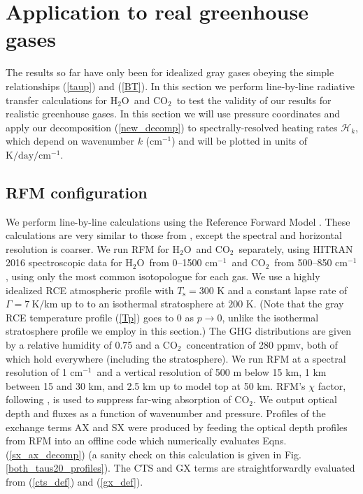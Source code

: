\documentclass{ametsoc}
\newcommand{\eqnref}[1]{(\ref{#1})}
\newcommand{\Kelvin}{\ensuremath{\mathrm{K}}}
\newcommand{\km}{\ensuremath{\mathrm{km}}}
\newcommand{\cminverse}{\ensuremath{\mathrm{cm^{-1}}}}
\newcommand{\Ts}{\ensuremath{T_\mathrm{s}}}
\newcommand{\cotwo}{\ensuremath{\mathrm{CO_2}}}
\newcommand{\htwo}{\ensuremath{\mathrm{H_2O}}}
\newcommand{\ch}{\ensuremath{\mathcal{H}}}
\newcommand{\chk}{\ensuremath{\ch_k}}
\begin{document}
\section{Application to real greenhouse gases} \label{sec_rfm_calcs}
The results so far have only been for idealized gray gases obeying the simple relationships \eqnref{taup} and \eqnref{BT}. In this section we perform line-by-line radiative transfer calculations for \htwo\ and \cotwo\ to test the validity of our results for realistic greenhouse gases. In this section we will use pressure coordinates and apply our decomposition \eqnref{new_decomp} to spectrally-resolved heating rates \chk, which depend on wavenumber $k$ (\cminverse) and will be plotted in  units of $\Kelvin/\mathrm{day}/\cminverse$.

\subsection{RFM configuration}
We perform line-by-line calculations using the Reference Forward Model  \citep[RFM,][]{dudhia2017}. These calculations are very similar to those from \cite{jeevanjee2019a}, except the spectral and horizontal resolution is coarser. We run RFM for \htwo\ and \cotwo\ separately, using  HITRAN 2016 spectroscopic data for \htwo\ from 0--1500 \cminverse\ and \cotwo\ from 500--850 \cminverse, using only the most common isotopologue for each gas. We use a highly idealized RCE atmospheric profile with $\Ts= 300$ K and a constant lapse rate of $\Gamma= 7\ \Kelvin/\km$ up to to an isothermal stratosphere at $200$ K. (Note that the gray RCE temperature profile \eqnref{Tp} goes to 0 as $p\rightarrow 0$, unlike the isothermal stratosphere profile we employ in this section.) The GHG distributions are given by a relative humidity of 0.75 and a  \cotwo\ concentration of 280 ppmv, both of which hold everywhere (including the stratosphere).   We run RFM at a spectral resolution of 1 \cminverse\ and a vertical resolution of 500 m below 15 km, 1 km between 15 and 30 km, and 2.5 km up to model top at 50 km. RFM's $\chi$ factor, following \cite{cousin1985}, is used to suppress far-wing absorption of \cotwo. We output optical depth and fluxes as a function of wavenumber and pressure. Profiles of the exchange terms AX and SX  were produced by feeding the optical depth profiles from RFM into an offline code which numerically evaluates  Eqns. \eqnref{sx_ax_decomp} (a sanity check on this calculation is given in Fig. \ref{both_taus20_profiles}). The CTS and GX terms are straightforwardly evaluated from \eqnref{cts_def} and \eqnref{gx_def}. 
\end{document}
